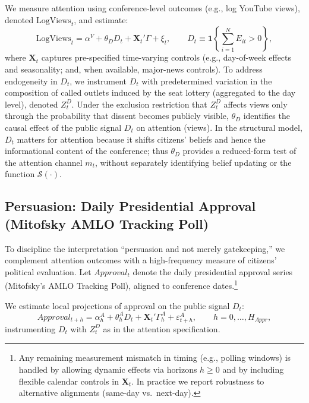 \documentclass[12pt]{article}
\begin{document}
We measure attention using conference-level outcomes (e.g., log YouTube views), denoted $\text{LogViews}_t$, and estimate:
\[
\text{LogViews}_t = \alpha^V + \theta_D D_t + \mathbf{X}_t'\Gamma + \xi_t,
\qquad
D_t \equiv \mathbf{1}\left\{\sum_{i=1}^N E_{it} > 0\right\},
\]
where $\mathbf{X}_t$ captures pre-specified time-varying controls (e.g., day-of-week effects and seasonality; and, when available, major-news controls). To address endogeneity in $D_t$, we instrument $D_t$ with predetermined variation in the composition of called outlets induced by the seat lottery (aggregated to the day level), denoted $Z^D_t$.
Under the exclusion restriction that $Z^D_t$ affects views only through the probability that dissent becomes publicly visible, $\theta_D$ identifies the causal effect of the public signal $D_t$ on attention (views). In the structural model, $D_t$ matters for attention because it shifts citizens' beliefs and hence the informational content of the conference; thus $\theta_D$ provides a reduced-form test of the attention channel $m_t$, without separately identifying belief updating or the function $\mathcal{S}(\cdot)$.

\subsection{Persuasion: Daily Presidential Approval (Mitofsky AMLO Tracking Poll)}

To discipline the interpretation ``persuasion and not merely gatekeeping,'' we complement attention outcomes with a high-frequency measure of citizens' political evaluation. Let $Approval_t$ denote the daily presidential approval series (Mitofsky's AMLO Tracking Poll), aligned to conference dates.\footnote{Any remaining measurement mismatch in timing (e.g., polling windows) is handled by allowing dynamic effects via horizons $h\ge 0$ and by including flexible calendar controls in $\mathbf{X}_t$. In practice we report robustness to alternative alignments (same-day vs.\ next-day).}

We estimate local projections of approval on the public signal $D_t$:
\begin{equation}\label{eq:approval_lp}
Approval_{t+h} = \alpha^{A}_h + \theta^{A}_h D_t + \mathbf{X}_t'\Gamma^{A}_h + \varepsilon^{A}_{t+h},
\qquad h=0,\dots,H_{Appr},
\end{equation}
instrumenting $D_t$ with $Z^D_t$ as in the attention specification.
\end{document}
